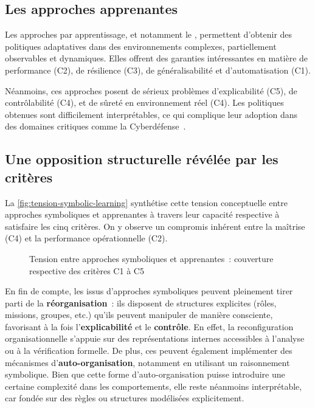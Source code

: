 \subsection{Les approches apprenantes}

Les approches par apprentissage, et notamment le , permettent d'obtenir des politiques adaptatives dans des environnements complexes, partiellement observables et dynamiques. Elles offrent des garanties intéressantes en matière de performance (C2), de résilience (C3), de généralisabilité et d'automatisation (C1).

Néanmoins, ces approches posent de sérieux problèmes d'explicabilité (C5), de contrôlabilité (C4), et de sûreté en environnement réel (C4). Les politiques obtenues sont difficilement interprétables, ce qui complique leur adoption dans des domaines critiques comme la Cyberdéfense~\cite{Gunning2019}.

\subsection{Une opposition structurelle révélée par les critères}

La \autoref{fig:tension-symbolic-learning} synthétise cette tension conceptuelle entre approches symboliques et apprenantes à travers leur capacité respective à satisfaire les cinq critères. On y observe un compromis inhérent entre la maîtrise (C4) et la performance opérationnelle (C2).

\begin{figure}[h!]
  \centering
  \resizebox{\textwidth}{!}{%
    
  }
  \caption{Tension entre approches symboliques et apprenantes~: couverture respective des critères C1 à C5}
  \label{fig:tension-symbolic-learning}
\end{figure}

En fin de compte, les  issus d'approches symboliques peuvent pleinement tirer parti de la \textbf{réorganisation}~: ils disposent de structures explicites (rôles, missions, groupes, etc.) qu'ils peuvent manipuler de manière consciente, favorisant à la fois l'\textbf{explicabilité} et le \textbf{contrôle}. En effet, la reconfiguration organisationnelle s'appuie sur des représentations internes accessibles à l'analyse ou à la vérification formelle. De plus, ces  peuvent également implémenter des mécanismes d'\textbf{auto-organisation}, notamment en utilisant un raisonnement symbolique. Bien que cette forme d'auto-organisation puisse introduire une certaine complexité dans les comportements, elle reste néanmoins interprétable, car fondée sur des règles ou structures modélisées explicitement.

